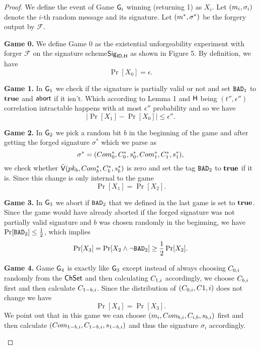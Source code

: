 \begin{proof}

We define the event of Game $\mathsf{G}_i$ winning (returning 1) as $X_i$. Let $(m_i,\sigma_i)$ denote the $i$-th random message and its signature. Let $(m^*,\sigma^*)$ be the forgery output by $\mathcal{F}$.
\begin{description}[wide,itemindent=\labelsep]
\item [] \textbf{Game 0.} We define Game 0 as the existential unforgeability experiment with forger $\mathcal{F}$ on the signature scheme$\mathsf{Sig}_{\mathsf{ID},\mathsf{H}}$ as shown in Figure 5. By definition, we have
$$\Pr[X_0] = \epsilon.$$
\item [] \textbf{Game 1.} In $\mathsf{G}_1$ we check if the signature is partially valid or not and set $\texttt{BAD}_1$ to $\textbf{true}$ and $\mathsf{abort}$ if it isn't. Which according to Lemma 1 and $\mathsf{H}$ being $(t'',\epsilon'')$ correlation intractable happens with at most $\epsilon''$ probability and so we have 
$$\mid \Pr[X_1]  - \Pr[X_0]\mid \leq \epsilon''.$$

\item [] \textbf{Game 2.} In $\mathsf{G}_2$ we pick a random bit $b$ in the beginning of the game and after getting the forged signature $\sigma^*$ which we parse as 
$$\sigma^* = (Com_0^*,C_0^*,s_0^*, Com_1^*, C_1^*,s_1^*),$$
we check whether $\tilde{\mathsf{V}}(pk_b,Com^*_b,C^*_b,s^*_b)$ is zero and set the tag $\texttt{BAD}_2$ to $\textbf{true}$ if it is. Since this change is only internal to the game 
$$\Pr[X_1] = \Pr[X_2].$$
\item [] \textbf{Game 3.} In $\mathsf{G}_3$ we abort if $\texttt{BAD}_2$ that we defined in the last game is set to $\textbf{true}$. Since the game would have already aborted if the forged signature was not partially valid signature and $b$ was chosen randomly in the beginning, we have
$\Pr[\texttt{BAD}_2] \leq \frac{1}{2}$, which implies
$$\Pr[X_3] = \Pr[X_2 \land \neg \texttt{BAD}_2] \geq \frac{1}{2} \Pr[X_2].$$

\item [] \textbf{Game 4.} 
Game $\mathsf{G}_4$ is exactly like $\mathsf{G}_3$ except instead of always choosing $C_{0,i}$ randomly from the $\mathsf{ChSet}$ and then calculating $C_{1,i}$ accordingly, we choose $C_{b,i}$ first and then calculate 
$C_{1-b,i}$. Since the distribution of $(C_{0,i},C{1,i})$ does not change we have
$$\Pr[X_4] = \Pr[X_3].$$
We point out that in this game we can choose $(m_i, Com_{b,i}, C_{i,b}, s_{b,i})$ first and then calculate 
$(Com_{1-b,i}, C_{1-b,i}, s_{1-b,i})$ and thus the signature $\sigma_i$ accordingly.


\end{description}
\end{proof}
